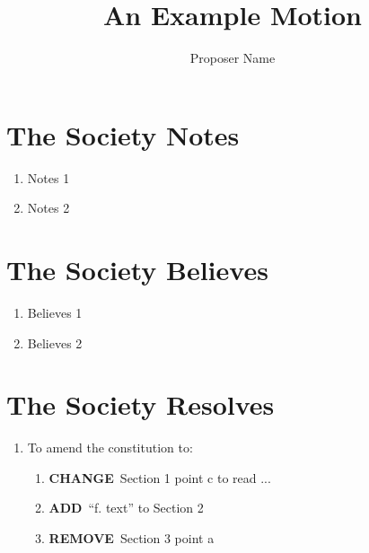\documentclass[a4paper,10pt]{article}
\title{An Example Motion}
\author{Proposer Name}
\date{}
\newcommand{\change}{\textbf{CHANGE}\ }
\newcommand{\add}{\textbf{ADD}\ }
\newcommand{\remove}{\textbf{REMOVE}\ }
\begin{document}
\maketitle

\section*{The Society Notes}
\begin{enumerate}
  \item Notes 1
  \item Notes 2
\end{enumerate}

\section*{The Society Believes}
\begin{enumerate}
  \item Believes 1
  \item Believes 2
\end{enumerate}

\section*{The Society Resolves}
\begin{enumerate}
  \item To amend the constitution to:
  \begin{enumerate}
    \item \change Section 1 point c to read ...
    \item \add ``f. text'' to Section 2
    \item \remove Section 3 point a
  \end{enumerate}
\end{enumerate}
\end{document}
